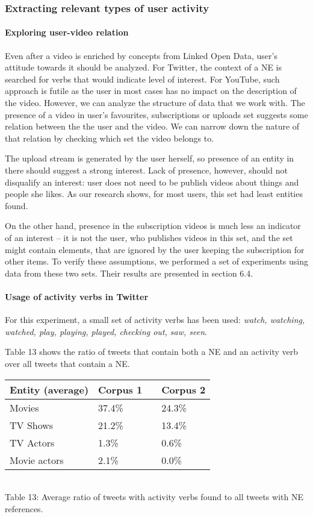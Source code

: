 \subsubsection{Extracting relevant types of user activity}

\paragraph{Exploring user-video relation} Even after a video is enriched by
concepts from Linked Open Data, user's attitude towards it should be analyzed.
For Twitter, the context of a NE is searched for verbs that would indicate
level of interest. For YouTube, such approach is futile as the user in most
cases has no impact on the description of the video. However, we can analyze
the structure of data that we work with. The presence of a video in
user's favourites, subscriptions or uploads set suggests some relation between
the the user and the video. We can narrow down the nature of that relation by
checking which set the video belongs to.

The upload stream is generated by the user herself, so presence of an entity in
there should suggest a strong interest. Lack of presence, however, should not
disqualify an interest: user does not need to be publish videos about things
and people she likes. As our research shows, for most users, this set had least
entities found.

On the other hand, presence in the subscription videos is much less an
indicator of an interest -- it is not the user, who publishes videos in this
set, and the set might contain elements, that are ignored by the user keeping
the subscription for other items. To verify these assumptions, we performed a
set of experiments using data from these two sets. Their results are presented
in section 6.4.

\paragraph{Usage of activity verbs in Twitter}
For this experiment, a small set of activity verbs has been used: \textit{watch, watching, watched,
play, playing, played, checking out, saw, seen}.

Table 13 shows the ratio of tweets that contain both a NE and an activity verb over all
tweets that contain a NE.

\begin{center}
  \begin{tabular}{ | p{4cm} | p{2cm} | p{1cm}| p{2cm} | } \hline
    Entity (average) & Corpus 1 & & Corpus 2 \\ \hline
    Movies & 37.4\% & & 24.3\% \\ \hline
    TV Shows & 21.2\% & & 13.4\% \\ \hline
    TV Actors & 1.3\% & & 0.6\% \\ \hline
    Movie actors & 2.1\% & & 0.0\% \\ \hline
  \end{tabular} \\
  Table 13: Average ratio of tweets with activity verbs found to all tweets with NE references. \\
\end{center}


